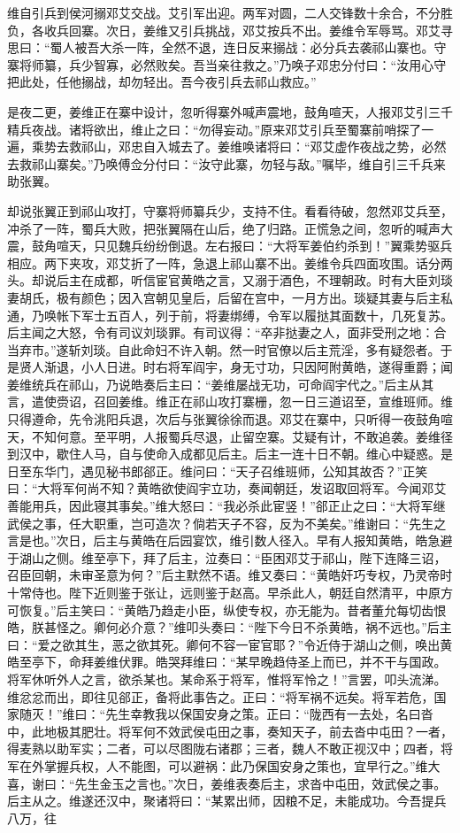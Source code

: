 维自引兵到侯河搦邓艾交战。艾引军出迎。两军对圆，二人交锋数十余合，不分胜负，各收兵回寨。次日，姜维又引兵挑战，邓艾按兵不出。姜维令军辱骂。邓艾寻思曰：“蜀人被吾大杀一阵，全然不退，连日反来搦战：必分兵去袭祁山寨也。守寨将师纂，兵少智寡，必然败矣。吾当亲往救之。”乃唤子邓忠分付曰：“汝用心守把此处，任他搦战，却勿轻出。吾今夜引兵去祁山救应。”

是夜二更，姜维正在寨中设计，忽听得寨外喊声震地，鼓角喧天，人报邓艾引三千精兵夜战。诸将欲出，维止之曰：“勿得妄动。”原来邓艾引兵至蜀寨前哨探了一遍，乘势去救祁山，邓忠自入城去了。姜维唤诸将曰：“邓艾虚作夜战之势，必然去救祁山寨矣。”乃唤傅佥分付曰：“汝守此寨，勿轻与敌。”嘱毕，维自引三千兵来助张翼。

却说张翼正到祁山攻打，守寨将师纂兵少，支持不住。看看待破，忽然邓艾兵至，冲杀了一阵，蜀兵大败，把张翼隔在山后，绝了归路。正慌急之间，忽听的喊声大震，鼓角喧天，只见魏兵纷纷倒退。左右报曰：“大将军姜伯约杀到！”翼乘势驱兵相应。两下夹攻，邓艾折了一阵，急退上祁山寨不出。姜维令兵四面攻围。话分两头。却说后主在成都，听信宦官黄皓之言，又溺于酒色，不理朝政。时有大臣刘琰妻胡氏，极有颜色；因入宫朝见皇后，后留在宫中，一月方出。琰疑其妻与后主私通，乃唤帐下军士五百人，列于前，将妻绑缚，令军以履挞其面数十，几死复苏。后主闻之大怒，令有司议刘琰罪。有司议得：“卒非挞妻之人，面非受刑之地：合当弃市。”遂斩刘琰。自此命妇不许入朝。然一时官僚以后主荒淫，多有疑怨者。于是贤人渐退，小人日进。时右将军阎宇，身无寸功，只因阿附黄皓，遂得重爵；闻姜维统兵在祁山，乃说皓奏后主曰：“姜维屡战无功，可命阎宇代之。”后主从其言，遣使赍诏，召回姜维。维正在祁山攻打寨栅，忽一日三道诏至，宣维班师。维只得遵命，先令洮阳兵退，次后与张翼徐徐而退。邓艾在寨中，只听得一夜鼓角喧天，不知何意。至平明，人报蜀兵尽退，止留空寨。艾疑有计，不敢追袭。姜维径到汉中，歇住人马，自与使命入成都见后主。后主一连十日不朝。维心中疑惑。是日至东华门，遇见秘书郎郤正。维问曰：“天子召维班师，公知其故否？”正笑曰：“大将军何尚不知？黄皓欲使阎宇立功，奏闻朝廷，发诏取回将军。今闻邓艾善能用兵，因此寝其事矣。”维大怒曰：“我必杀此宦竖！”郤正止之曰：“大将军继武侯之事，任大职重，岂可造次？倘若天子不容，反为不美矣。”维谢曰：“先生之言是也。”次日，后主与黄皓在后园宴饮，维引数人径入。早有人报知黄皓，皓急避于湖山之侧。维至亭下，拜了后主，泣奏曰：“臣困邓艾于祁山，陛下连降三诏，召臣回朝，未审圣意为何？”后主默然不语。维又奏曰：“黄皓奸巧专权，乃灵帝时十常侍也。陛下近则鉴于张让，远则鉴于赵高。早杀此人，朝廷自然清平，中原方可恢复。”后主笑曰：“黄皓乃趋走小臣，纵使专权，亦无能为。昔者董允每切齿恨皓，朕甚怪之。卿何必介意？”维叩头奏曰：“陛下今日不杀黄皓，祸不远也。”后主曰：“爱之欲其生，恶之欲其死。卿何不容一宦官耶？”令近侍于湖山之侧，唤出黄皓至亭下，命拜姜维伏罪。皓哭拜维曰：“某早晚趋侍圣上而已，并不干与国政。将军休听外人之言，欲杀某也。某命系于将军，惟将军怜之！”言罢，叩头流涕。维忿忿而出，即往见郤正，备将此事告之。正曰：“将军祸不远矣。将军若危，国家随灭！”维曰：“先生幸教我以保国安身之策。正曰：“陇西有一去处，名曰沓中，此地极其肥壮。将军何不效武侯屯田之事，奏知天子，前去沓中屯田？一者，得麦熟以助军实；二者，可以尽图陇右诸郡；三者，魏人不敢正视汉中；四者，将军在外掌握兵权，人不能图，可以避祸：此乃保国安身之策也，宜早行之。”维大喜，谢曰：“先生金玉之言也。”次日，姜维表奏后主，求沓中屯田，效武侯之事。后主从之。维遂还汉中，聚诸将曰：“某累出师，因粮不足，未能成功。今吾提兵八万，往